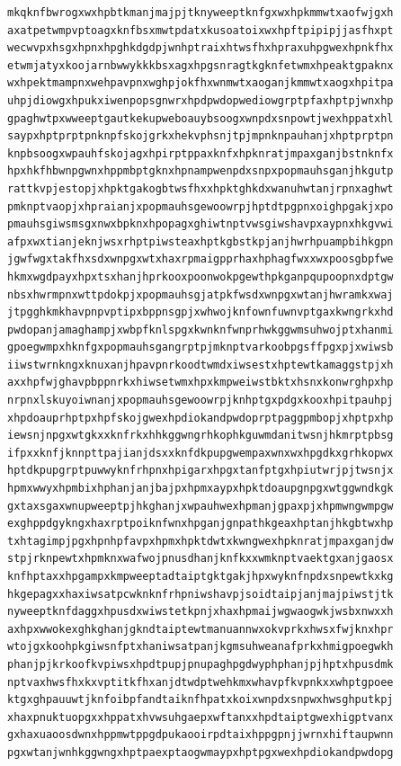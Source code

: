 \documentclass[11pt,letterpaper]{exam}
\begin{document}
\begin{questions}
\begin{verbatim}
mkqknfbwrogxwxhpbtkmanjmajpjtknyweeptknfgxwxhpkmmwtxaofwjgxh
axatpetwmpvptoagxknfbsxmwtpdatxkusoatoixwxhpftpipipjjasfhxpt
wecwvpxhsgxhpnxhpghkdgdpjwnhptraixhtwsfhxhpraxuhpgwexhpnkfhx
etwmjatyxkoojarnbwwykkkbsxagxhpgsnragtkgknfetwmxhpeaktgpaknx
wxhpektmampnxwehpavpnxwghpjokfhxwnmwtxaoganjkmmwtxaogxhpitpa
uhpjdiowgxhpukxiwenpopsgnwrxhpdpwdopwediowgrptpfaxhptpjwnxhp
gpaghwtpxwweeptgautkekupweboauybsoogxwnpdxsnpowtjwexhppatxhl
saypxhptprptpnknpfskojgrkxhekvphsnjtpjmpnknpauhanjxhptprptpn
knpbsoogxwpauhfskojagxhpirptppaxknfxhpknratjmpaxganjbstnknfx
hpxhkfhbwnpgwnxhppmbptgknxhpnampwenpdxsnpxpopmauhsganjhkgutp
rattkvpjestopjxhpktgakogbtwsfhxxhpktghkdxwanuhwtanjrpnxaghwt
pmknptvaopjxhpraianjxpopmauhsgewoowrpjhptdtpgpnxoighpgakjxpo
pmauhsgiwsmsgxnwxbpknxhpopagxghiwtnptvwsgiwshavpxaypnxhkgvwi
afpxwxtianjeknjwsxrhptpiwsteaxhptkgbstkpjanjhwrhpuampbihkgpn
jgwfwgxtakfhxsdxwnpgxwtxhaxrpmaigpprhaxhphagfwxxwxpoosgbpfwe
hkmxwgdpayxhpxtsxhanjhprkooxpoonwokpgewthpkganpqupoopnxdptgw
nbsxhwrmpnxwttpdokpjxpopmauhsgjatpkfwsdxwnpgxwtanjhwramkxwaj
jtpgghkmkhavpnpvptipxbppnsgpjxwhwojknfownfuwnvptgaxkwngrkxhd
pwdopanjamaghampjxwbpfknlspgxkwnknfwnprhwkggwmsuhwojptxhanmi
gpoegwmpxhknfgxpopmauhsgangrptpjmknptvarkoobpgsffpgxpjxwiwsb
iiwstwrnkngxknuxanjhpavpnrkoodtwmdxiwsestxhptewtkamaggstpjxh
axxhpfwjghavpbppnrkxhiwsetwmxhpxkmpweiwstbktxhsnxkonwrghpxhp
nrpnxlskuyoiwnanjxpopmauhsgewoowrpjknhptgxpdgxkooxhpitpauhpj
xhpdoauprhptpxhpfskojgwexhpdiokandpwdoprptpaggpmbopjxhptpxhp
iewsnjnpgxwtgkxxknfrkxhhkggwngrhkophkguwmdanitwsnjhkmrptpbsg
ifpxxknfjknnpttpajianjdsxxknfdkpupgwempaxwnxwxhpgdkxgrhkopwx
hptdkpupgrptpuwwyknfrhpnxhpigarxhpgxtanfptgxhpiutwrjpjtwsnjx
hpmxwwyxhpmbixhphanjanjbajpxhpmxaypxhpktdoaupgnpgxwtggwndkgk
gxtaxsgaxwnupweeptpjhkghanjxwpauhwexhpmanjgpaxpjxhpmwngwmpgw
exghppdgykngxhaxrptpoiknfwnxhpganjgnpathkgeaxhptanjhkgbtwxhp
txhtagimpjpgxhpnhpfavpxhpmxhpktdwtxkwngwexhpknratjmpaxganjdw
stpjrknpewtxhpmknxwafwojpnusdhanjknfkxxwmknptvaektgxanjgaosx
knfhptaxxhpgampxkmpweeptadtaiptgktgakjhpxwyknfnpdxsnpewtkxkg
hkgepagxxhaxiwsatpcwknknfrhpniwshavpjsoidtaipjanjmajpiwstjtk
nyweeptknfdaggxhpusdxwiwstetkpnjxhaxhpmaijwgwaogwkjwsbxnwxxh
axhpxwwokexghkghanjgkndtaiptewtmanuannwxokvprkxhwsxfwjknxhpr
wtojgxkoohpkgiwsnfptxhaniwsatpanjkgmsuhweanafprkxhmigpoegwkh
phanjpjkrkoofkvpiwsxhpdtpupjpnupaghpgdwyphphanjpjhptxhpusdmk
nptvaxhwsfhxkxvptitkfhxanjdtwdptwehkmxwhavpfkvpnkxxwhptgpoee
ktgxghpauuwtjknfoibpfandtaiknfhpatxkoixwnpdxsnpwxhwsghputkpj
xhaxpnuktuopgxxhppatxhvwsuhgaepxwftanxxhpdtaiptgwexhigptvanx
gxhaxuaoosdwnxhppmwtppgdpukaooirpdtaixhppgpnjjwrnxhiftaupwnn
pgxwtanjwnhkggwngxhptpaexptaogwmaypxhptpgxwexhpdiokandpwdopg

\end{verbatim}
\end{questions}
\end{document}
